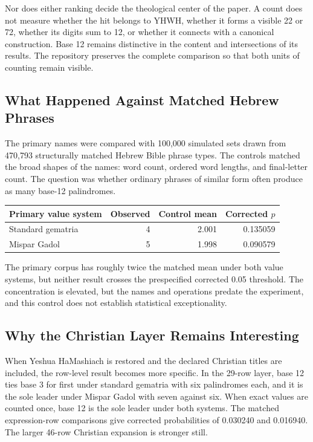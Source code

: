 Nor does either ranking decide the theological center of the paper. A count does not measure whether the hit belongs to YHWH, whether it forms a visible 22 or 72, whether its digits sum to 12, or whether it connects with a canonical construction. Base 12 remains distinctive in the content and intersections of its results. The repository preserves the complete comparison so that both units of counting remain visible.

\subsection{What Happened Against Matched Hebrew Phrases}

The primary names were compared with 100,000 simulated sets drawn from 470,793 structurally matched Hebrew Bible phrase types. The controls matched the broad shapes of the names: word count, ordered word lengths, and final-letter count. The question was whether ordinary phrases of similar form often produce as many base-12 palindromes.

\begin{center}
\small
\begin{tabular}{lrrr}
\toprule
Primary value system & Observed & Control mean & Corrected $p$ \\
\midrule
Standard gematria & 4 & 2.001 & 0.135059 \\
Mispar Gadol & 5 & 1.998 & 0.090579 \\
\bottomrule
\end{tabular}
\end{center}

The primary corpus has roughly twice the matched mean under both value systems, but neither result crosses the prespecified corrected 0.05 threshold. The concentration is elevated, but the names and operations predate the experiment, and this control does not establish statistical exceptionality.

\subsection{Why the Christian Layer Remains Interesting}

When Yeshua HaMashiach is restored and the declared Christian titles are included, the row-level result becomes more specific. In the 29-row layer, base 12 ties base 3 for first under standard gematria with six palindromes each, and it is the sole leader under Mispar Gadol with seven against six. When exact values are counted once, base 12 is the sole leader under both systems. The matched expression-row comparisons give corrected probabilities of 0.030240 and 0.016940. The larger 46-row Christian expansion is stronger still.


